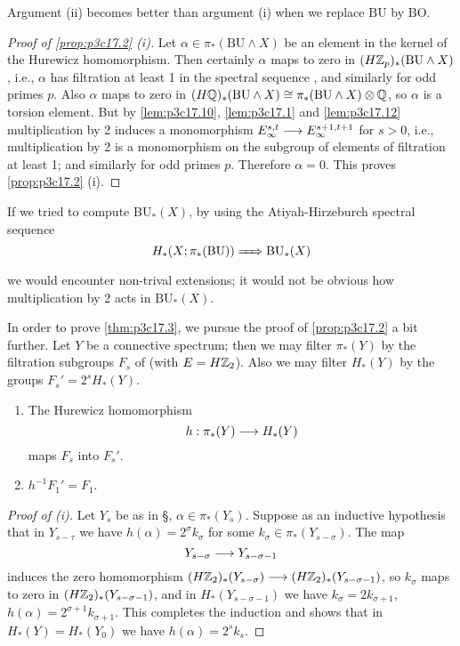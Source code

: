 \documentclass[../main]{subfiles}
\begin{document}
\begin{remark*}
Argument (ii) becomes better than argument (i) when we replace $\mathrm{BU}$ by $\mathrm{BO}$. 
\end{remark*} 

\begin{proof}[Proof of \ref{prop:p3c17.2} (i)]
Let $\alpha \in \pi_\ast(\mathrm{BU} \wedge X)$ be an element in the kernel of the Hurewicz homomorphism. Then certainly $\alpha$ maps to zero in $(H \mathbb{Z}_p)_\ast(\mathrm{BU} \wedge X)$, i.e., $\alpha$ has filtration at least 1 in the spectral sequence , and similarly for odd primes $p$. Also $\alpha$ maps to zero in $(H \mathbb{Q})_\ast(\mathrm{BU} \wedge X) \cong \pi_\ast(\mathrm{BU} \wedge X) \otimes \mathbb{Q}$, so $\alpha$ is a torsion element. But by \ref{lem:p3c17.10}, \ref{lem:p3c17.1} and \ref{lem:p3c17.12} multiplication by 2 induces a monomorphism $E_\infty^{s, t} \overset{}{\longrightarrow} E_\infty^{s + 1, t + 1}$ for $s > 0$, i.e., multiplication by 2 is a monomorphism on the subgroup of elements of filtration at least 1; and similarly for odd primes $p$. Therefore $\alpha = 0$. This proves \ref{prop:p3c17.2} (i).
\end{proof}

\begin{remark*}
If we tried to compute $\mathrm{BU}_\ast(X)$, by using the Atiyah-Hirzeburch spectral sequence $$H_\ast(X; \pi_\ast(\mathrm{BU})) \xRightarrow{\phantom{.....}} \mathrm{BU}_\ast(X)$$ we would encounter non-trival extensions; it would not be obvious how multiplication by 2 acts in $\mathrm{BU}_\ast(X)$. 
\end{remark*} 

In order to prove \ref{thm:p3c17.3}, we pursue the proof of \ref{prop:p3c17.2} a bit further. Let $Y$ be a connective spectrum; then we may filter $\pi_\ast(Y)$ by the filtration subgroups $F_s$ of  (with $E = H \mathbb{Z}_2$). Also we may filter $H_\ast(Y)$ by the groups $F_s' = 2^s H_\ast(Y)$.

\begin{lemma}
\label{lem:p3c17.13}
\begin{enumerate}
    \item[(i)] The Hurewicz homomorphism $$h : \pi_\ast(Y) \overset{}{\longrightarrow} H_\ast(Y)$$ maps $F_s$ into $F_s'$.
    \item[(ii)] $h^{-1} F_1' = F_1$.
\end{enumerate}
\end{lemma}

\begin{proof}[Proof of (i)]
Let $Y_s$ be as in \S{}, $\alpha \in \pi_\ast(Y_s)$. Suppose as an inductive hypothesis that in $Y_{s - \tau}$ we have $h(\alpha) = 2^\sigma k_\sigma$ for some $k_\sigma \in \pi_\ast(Y_{s - \sigma})$. The map $$Y_{s - \sigma} \overset{}{\longrightarrow} Y_{s - \sigma - 1}$$ induces the zero homomorphism $(H \mathbb{Z}_2)_\ast(Y_{s - \sigma}) \overset{}{\longrightarrow} (H \mathbb{Z}_2)_\ast(Y_{s - \sigma - 1})$, so $k_\sigma$ maps to zero in $(H \mathbb{Z}_2)_\ast(Y_{s - \sigma - 1})$, and in $H_\ast(Y_{s - \sigma - 1})$ we have $k_\sigma = 2 k_{\sigma + 1}$, $h(\alpha) = 2^{\sigma + 1} k_{\sigma + 1}$. This completes the induction and shows that in $H_\ast(Y) = H_\ast(Y_0)$ we have $h(\alpha) = 2^sk_s$.
\end{proof}
\end{document}
